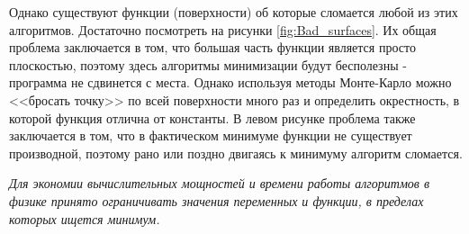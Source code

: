  Однако существуют функции (поверхности) об которые сломается любой из этих алгоритмов. Достаточно посмотреть на рисунки \ref{fig:Bad_surfaces}. Их общая проблема заключается в том, что большая часть функции является просто плоскостью, поэтому здесь алгоритмы минимизации будут бесполезны - программа не сдвинется с места. Однако используя методы Монте-Карло можно <<бросать точку>> по всей поверхности много раз и определить окрестность, в которой функция отлична от константы. В левом рисунке проблема также заключается в том, что в фактическом минимуме функции не существует производной, поэтому рано или поздно двигаясь к минимуму алгоритм сломается.
 
 
 \textit{Для экономии вычислительных мощностей и времени работы алгоритмов в физике принято ограничивать значения переменных и функции, в пределах которых ищется минимум.}